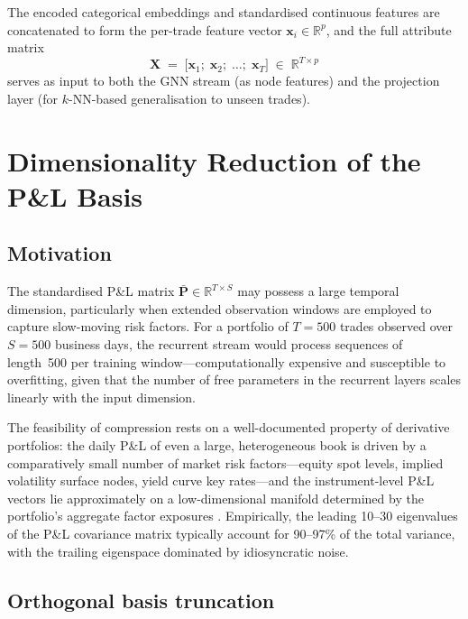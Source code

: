 \documentclass[11pt,a4paper]{article}
\newcommand{\R}{\mathbb{R}}
\newcommand{\bx}{\bm{x}}
\newcommand{\bP}{\bm{P}}
\newcommand{\bX}{\bm{X}}
\begin{document}
The encoded categorical embeddings and standardised continuous features are
concatenated to form the per-trade feature vector
$\bx_i \in \R^p$, and the full attribute matrix
%
\begin{equation}\label{eq:attribute-matrix}
  \bX
  \;=\;
  \bigl[\bx_1;\;\bx_2;\;\dotsc;\;\bx_T\bigr]
  \;\in\; \R^{T \times p}
\end{equation}
%
serves as input to both the GNN stream (as node features) and the projection
layer (for $k$-NN-based generalisation to unseen trades).


\section{Dimensionality Reduction of the P\&L Basis}\label{sec:dimred}

\subsection{Motivation}\label{sec:dimred:motivation}

The standardised P\&L matrix $\bar{\bP} \in \R^{T \times S}$ may possess a
large temporal dimension, particularly when extended observation windows are
employed to capture slow-moving risk factors.  For a portfolio of $T = 500$
trades observed over $S = 500$ business days, the recurrent stream would
process sequences of length~500 per training window---computationally
expensive and susceptible to overfitting, given that the number of free
parameters in the recurrent layers scales linearly with the input dimension.

The feasibility of compression rests on a well-documented property of
derivative portfolios: the daily P\&L of even a large, heterogeneous book is
driven by a comparatively small number of market risk factors---equity spot
levels, implied volatility surface nodes, yield curve key rates---and the
instrument-level P\&L vectors lie approximately on a low-dimensional manifold
determined by the portfolio's aggregate factor exposures
\cite{cont2011statistical,litterman1991common}.  Empirically, the leading
10--30 eigenvalues of the P\&L covariance matrix typically account for 90--97\%
of the total variance, with the trailing eigenspace dominated by idiosyncratic
noise.


\subsection{Orthogonal basis truncation}\label{sec:dimred:truncation}
\end{document}
